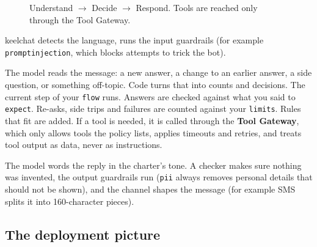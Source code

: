 \documentclass[11pt,a4paper]{article}
\newcommand{\codeus}{\textunderscore\allowbreak}
\newcommand{\code}[1]{{\renewcommand{\_}{\codeus}\texttt{\upshape #1}}}
\newcommand{\key}[1]{{\renewcommand{\_}{\codeus}\texttt{\color{ckey}#1}}}
\begin{document}
\begin{figure}[h]
\caption{Understand $\rightarrow$ Decide $\rightarrow$ Respond. Tools are reached only through the Tool Gateway.}
\end{figure}

\begin{description}[leftmargin=0pt,style=nextline]
  \item[Understand] keelchat detects the language, runs the input guardrails (for example
    \code{prompt\_injection}, which blocks attempts to trick the bot).
  \item[Decide] The model reads the message: a new answer, a change to an earlier answer, a side question, or
    something off-topic. Code turns that into counts and decisions. The current step of your \key{flow} runs. Answers are checked against what you said to
    \key{expect}. Re-asks, side trips and failures are counted against your \key{limits}. Rules that fit are
    added. If a tool is needed, it is called through the \textbf{Tool Gateway}, which only allows tools the
    policy lists, applies timeouts and retries, and treats tool output as data, never as instructions.
  \item[Respond] The model words the reply in the charter's tone. A checker makes sure nothing was invented, the
    output guardrails run (\code{pii} always removes personal details that should not be shown), and the
    channel shapes the message (for example SMS splits it into 160-character pieces).
\end{description}

\subsection{The deployment picture}
\end{document}
